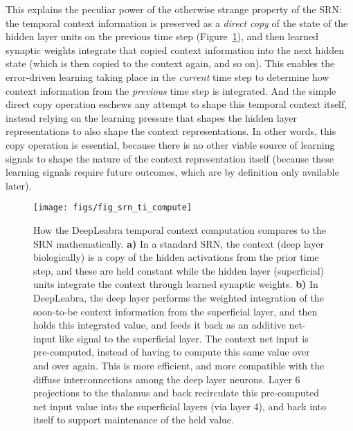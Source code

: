This explains the peculiar power of the otherwise strange property of the SRN: the temporal context information is preserved as a {\em direct copy} of the state of the hidden layer units on the previous time step (Figure~\ref{fig.srn_vs_ti}), and then learned synaptic weights integrate that copied context information into the next hidden state (which is then copied to the context again, and so on).  This enables the error-driven learning taking place in the {\em current} time step to determine how context information from the {\em previous} time step is integrated.  And the simple direct copy operation eschews any attempt to shape this temporal context itself, instead relying on the learning pressure that shapes the hidden layer representations to also shape the context representations.  In other words, this copy operation is essential, because there is no other viable source of learning signals to shape the nature of the context representation itself (because these learning signals require future outcomes, which are by definition only available later).

\begin{figure}
  \centering\texttt{[image: figs/fig\_srn\_ti\_compute]}
  \caption{\footnotesize  How the DeepLeabra temporal context computation compares to the SRN mathematically. {\bf a)} In a standard SRN, the context (deep layer biologically) is a copy of the hidden activations from the prior time step, and these are held constant while the hidden layer (superficial) units integrate the context through learned synaptic weights.  {\bf b)} In DeepLeabra, the deep layer performs the weighted integration of the soon-to-be context information from the superficial layer, and then holds this integrated value, and feeds it back as an additive net-input like signal to the superficial layer.  The context net input is pre-computed, instead of having to compute this same value over and over again.  This is more efficient, and more compatible with the diffuse interconnections among the deep layer neurons.  Layer 6 projections to the thalamus and back recirculate this pre-computed net input value into the superficial layers (via layer 4), and back into itself to support maintenance of the held value.}
  \label{fig.srn_vs_ti}
\end{figure}

